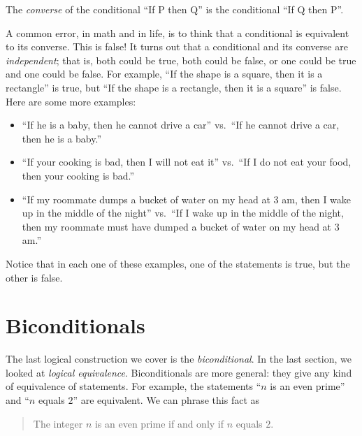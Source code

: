 \documentclass{tufte-book}
\begin{document}
\begin{definition}
  The \emph{converse} of the conditional ``If P then Q'' is the conditional ``If Q then P''.
\end{definition}

A common error, in math and in life, is to think that a conditional is equivalent to its converse. This is false! It turns out that a conditional and its converse are \emph{independent}; that is, both could be true, both could be false, or one could be true and one could be false. For example, ``If the shape is a square, then it is a rectangle'' is true, but ``If the shape is a rectangle, then it is a square'' is false.  Here are some more examples:
\begin{itemize}
    \item ``If he is a baby, then he cannot drive a car'' vs.\ ``If he cannot drive a car, then he is a baby.''
    \item ``If your cooking is bad, then I will not eat it'' vs.\ ``If I do not eat your food, then your cooking is bad.''
    \item ``If my roommate dumps a bucket of water on my head at 3 am, then I wake up in the middle of the night'' vs.\ ``If I wake up in the middle of the night, then my roommate must have dumped a bucket of water on my head at 3 am.''
\end{itemize}

Notice that in each one of these examples, one of the statements is true, but the other is false.



\section{Biconditionals}
\label{sec:biconditionals}

The last logical construction we cover is the \emph{biconditional}. In the last section, we looked at \emph{logical equivalence}. Biconditionals are more general: they give any kind of equivalence of statements. For example, the statements ``$n$ is an even prime'' and ``$n$ equals $2$'' are equivalent. We can phrase this fact as
\begin{quote}
  The integer $n$ is an even prime if and only if $n$ equals $2$.
\end{quote}
\end{document}
